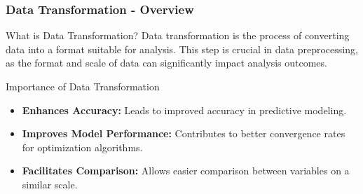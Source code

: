 \documentclass[aspectratio=169]{beamer}
\begin{document}
\begin{frame}[fragile]
    \frametitle{Data Transformation - Overview}
    \begin{block}{What is Data Transformation?}
        Data transformation is the process of converting data into a format suitable for analysis. This step is crucial in data preprocessing, as the format and scale of data can significantly impact analysis outcomes.
    \end{block}
    
    \begin{block}{Importance of Data Transformation}
        \begin{itemize}
            \item \textbf{Enhances Accuracy:} Leads to improved accuracy in predictive modeling.
            \item \textbf{Improves Model Performance:} Contributes to better convergence rates for optimization algorithms.
            \item \textbf{Facilitates Comparison:} Allows easier comparison between variables on a similar scale.
        \end{itemize}
    \end{block}
\end{frame}
\end{document}

